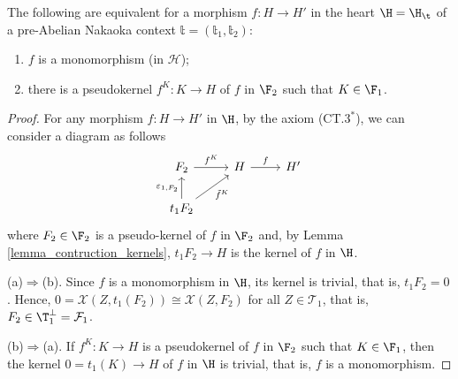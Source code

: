 \begin{prop}\label{prop:1.4}
The following are equivalent for a morphism $f\colon H\to H'$ in the heart $\H=\H_\t$ of a pre-Abelian Nakaoka context $\mathbb{t}=(\mathbb{t}_1,\mathbb{t}_2)$:
\begin{enumerate}[label=(\alph*)]
\item $f$ is a monomorphism (in $\mathcal{H}$);
\item there is a pseudokernel $f^K\colon K\to H$ of $f$ in $\F_2$ such that $K\in \F_1$. 
\end{enumerate}
\end{prop}
\begin{proof}
For any morphism $f\colon H\to H'$ in $\H$, by the axiom (CT.$3^*$), we can consider a diagram as follows
\begin{equation*}
\begin{tikzcd}
F_2\arrow{r}{f^K} & H\arrow{r}{f} & H'\\
t_1{F_2}\arrow{u}{\varepsilon_{1,F_2}}\arrow{ur}[']{\tilde{f}^K}
\end{tikzcd}
\end{equation*}
where $F_2\in \F_2$ is a pseudo-kernel of $f$ in $\F_2$ and, by Lemma \ref{lemma_contruction_kernels}, $t_1F_2\to H$ is the kernel of $f$ in $\H$.

\smallskip\noindent
(a)$\Rightarrow$(b). Since $f$ is a monomorphism in $\H$, its kernel is trivial, that is, $t_1F_2=0$. Hence, $0=\mathcal{X}(Z,t_1(F_2))\cong \mathcal{X}(Z,F_2)$ for all $Z\in\mathcal{T}_1$, that is, $F_2\in\T_1^{\perp}=\mathcal{F}_1$.

\smallskip\noindent
(b)$\Rightarrow$(a). If  $f^K\colon K\to H$ is a pseudokernel of $f$ in $\F_2$ such that $K\in \F_1$, then the kernel $0=t_1(K)\to H$ of $f$
 in $\H$ is trivial, that is, $f$ is a monomorphism.
\end{proof}






